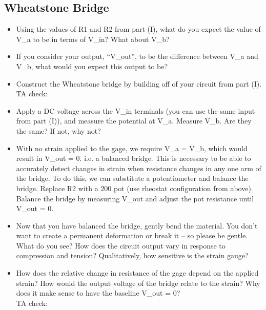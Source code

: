 \documentclass{article}
\begin{document}
\subsection*{Wheatstone Bridge}
\begin{itemize}
	\item Using the values of R1 and R2 from part (I), what do you expect the value of V\_a to be in terms of V\_in? What about V\_b?\vspace{2cm}
	\item If you consider your output, “V\_out”, to be the difference between V\_a and V\_b, what would you expect this output to be?\vspace{2cm}
	\item Construct the Wheatstone bridge by building off of your circuit from part (I).\\TA check: \underline{\hspace{2cm}}
	\item Apply a DC voltage across the V\_in terminals (you can use the same input from part (I)), and measure the potential at V\_a. Measure V\_b. Are they the same? If not, why not?\vspace{2cm}
	\item With no strain applied to the gage, we require V\_a = V\_b, which would result in V\_out = 0. i.e. a balanced bridge. This is necessary to be able to accurately detect changes in strain when resistance changes in any one arm of the bridge. To do this, we can substitute a potentiometer and balance the bridge. Replace R2 with a 200 \textOmega pot (use rheostat configuration from above). Balance the bridge by measuring V\_out and adjust the pot resistance until V\_out = 0.
	\item Now that you have balanced the bridge, gently bend the material. You don’t want to create a permanent deformation or break it – so please be gentle. What do you see? How does the circuit output vary in response to compression and tension? Qualitatively, how sensitive is the strain gauge?\vspace{3cm}
	\item How does the relative change in resistance of the gage depend on the applied strain? How would the output voltage of the bridge relate to the strain? Why does it make sense to have the baseline V\_out = 0?\\TA check: \underline{\hspace{2cm}}
\end{itemize}
\end{document}
